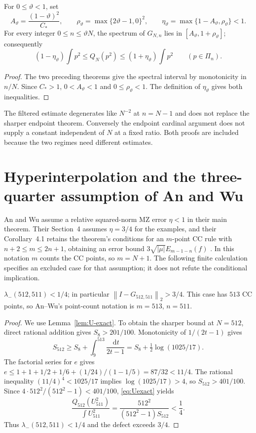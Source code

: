 \documentclass{siamart251216}
\newcommand{\Pn}{\Pi}
\newcommand{\norm}[1]{\left\lVert#1\right\rVert}
\newcommand{\dd}{\,\mathrm d}
\begin{document}
\begin{corollary}\label{cor:strong}%
For $0\le\vartheta<1$, set
\[
 A_\vartheta=\frac{(1-\vartheta)^2}{C_*},\qquad
 \rho_\vartheta=\max\{2\vartheta-1,0\}^2,\qquad
 \eta_\vartheta=\max\{1-A_\vartheta,\rho_\vartheta\}<1.
\]
For every integer $0\le n\le\vartheta N$, the spectrum of $G_{N,n}$ lies
in $[A_\vartheta,1+\rho_\vartheta]$; consequently
\[
 (1-\eta_\vartheta)\int p^2\le Q_N(p^2)
                    \le(1+\eta_\vartheta)\int p^2\qquad(p\in\Pn_n).
\]
\end{corollary}
\begin{proof}
The two preceding theorems give the spectral interval by monotonicity in
$n/N$. Since $C_*>1$, $0<A_\vartheta<1$ and $0\le\rho_\vartheta<1$.
The definition of $\eta_\vartheta$ gives both inequalities.
\end{proof}

The filtered estimate degenerates like $N^{-2}$ at $n=N-1$ and does not
replace the sharper endpoint theorem. Conversely the endpoint cardinal
argument does not supply a constant independent of $N$ at a fixed ratio.
Both proofs are included because the two regimes need different estimates.

\section{Hyperinterpolation and the three-quarter assumption of An and Wu}\label{sec:hyper}

An and Wu assume a relative squared-norm MZ error
$\eta<1$ in their main theorem. Their Section~4 assumes $\eta=3/4$ for the
examples, and their Corollary~4.1 retains the theorem's conditions for an
$m$-point CC rule with $n+2\le m\le2n+1$, obtaining an error bound
$3\sqrt{|\mu|} E_{m-1-n}(f)$ \cite[Sect.~4, Cor.~4.1]{LIT-046}. In this
notation $m$ counts the CC points, so $m=N+1$.
The following finite calculation specifies an excluded case for that
assumption; it does not refute the conditional implication.

\begin{proposition}\label{prop:counterexample}%
$\lambda_-(512,511)<1/4$; in particular $\norm{I-G_{512,511}}_2>3/4$.
This case has $513$ CC points, so An--Wu's point-count notation is
$m=513$, $n=511$.
\end{proposition}
\begin{proof}
We use Lemma~\ref{lem:U-exact}. To obtain the sharper bound at $N=512$, direct rational addition gives
$S_8>201/100$. Monotonicity of $1/(2t-1)$ gives
\[
 S_{512}\ge S_8+\int_9^{513}\frac{\dd t}{2t-1}
          =S_8+\tfrac12\log(1025/17).
\]
The factorial series for $e$ gives
$e\le1+1+1/2+1/6+(1/24)/(1-1/5)=87/32<11/4$.
The rational inequality $(11/4)^4<1025/17$ implies
$\log(1025/17)>4$, so $S_{512}>401/100$.
Since $4\cdot512^2/(512^2-1)<401/100$, \eqref{eq:Uexact} yields
\[
 \frac{Q_{512}(U_{511}^2)}{\int U_{511}^2}
 =\frac{512^2}{(512^2-1)S_{512}}<\frac14.
\]
Thus $\lambda_-(512,511)<1/4$ and the defect exceeds $3/4$.
\end{proof}
\end{document}
